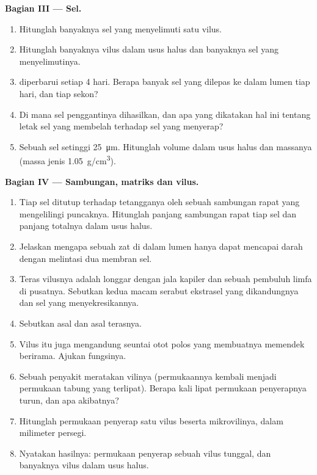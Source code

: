\begin{problem}
\medskip
\noindent\textbf{Bagian III --- Sel.}
\begin{enumerate}[resume]
  \item Hitunglah banyaknya sel  yang menyelimuti satu vilus.
  \item Hitunglah banyaknya vilus dalam usus halus dan banyaknya sel
         yang menyelimutinya.
  \item {} diperbarui setiap \qty{4}{} hari. Berapa banyak sel
        yang dilepas ke dalam lumen tiap hari, dan tiap sekon?
  \item Di mana sel penggantinya dihasilkan, dan apa yang dikatakan hal
        ini tentang letak sel yang membelah terhadap sel yang menyerap?
  \item Sebuah sel  setinggi \qty{25}{\micro m}. Hitunglah volume
         dalam usus halus dan massanya (massa jenis
        \qty{1.05}{g/cm^3}).
\end{enumerate}

\medskip
\noindent\textbf{Bagian IV --- Sambungan, matriks dan vilus.}
\begin{enumerate}[resume]
  \item Tiap sel ditutup terhadap tetangganya oleh sebuah sambungan
        rapat yang mengelilingi puncaknya. Hitunglah panjang sambungan
        rapat tiap sel dan panjang totalnya dalam usus halus.
  \item Jelaskan mengapa sebuah zat di dalam lumen hanya dapat mencapai
        darah dengan melintasi dua membran sel.
  \item Teras vilusnya adalah  longgar dengan jala kapiler
        dan sebuah pembuluh limfa di pusatnya. Sebutkan kedua macam
        serabut ekstrasel yang dikandungnya dan sel yang
        menyekresikannya.
  \item Sebutkan  asal  dan asal terasnya.
  \item Vilus itu juga mengandung seuntai otot polos yang membuatnya
        memendek berirama. Ajukan fungsinya.
  \item Sebuah penyakit meratakan vilinya (permukaannya kembali menjadi
        permukaan tabung yang terlipat). Berapa kali lipat permukaan
        penyerapnya turun, dan apa akibatnya?
  \item Hitunglah permukaan penyerap satu vilus beserta mikrovilinya,
        dalam milimeter persegi.
  \item Nyatakan hasilnya: permukaan penyerap sebuah vilus tunggal, dan
        banyaknya vilus dalam usus halus.
\end{enumerate}
\end{problem}
